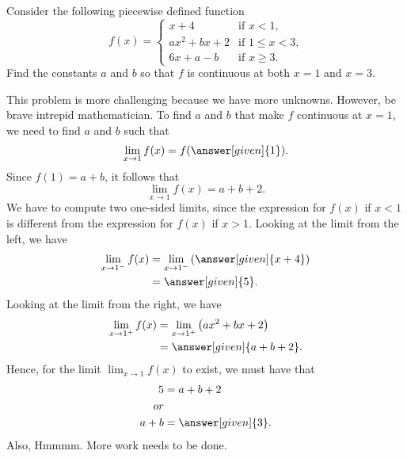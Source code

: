 \documentclass{ximera}
\begin{document}
\begin{example}
Consider the following piecewise defined function
\[
f(x) = 
\begin{cases}
  x+4 &\text{if $x<1$,}\\
  ax^2+bx+2 &\text{if $1\le x< 3$,}\\
  6x+a-b &\text{if $x\ge 3$.}
\end{cases}
\]
Find the constants $a$ and $b$ so that $f$ is continuous at both $x=1$ and $x=3$.
\begin{explanation}
This problem is more challenging because we have more
unknowns. However, be brave intrepid mathematician.  To find $a$ and
$b$ that make $f$ continuous at $x=1$, we need to find $a$ and $b$
such that
\[
\lim_{x\to 1} f(x) =f(\answer[given]{1}).
\]
Since $f(1)=a+b$, it follows that 
\[
\lim_{x\to 1} f(x) =a+b+2.
\]
We have to compute two one-sided limits, since the expression for  $f(x)$ if $x<1$ is  different from the expression for $f(x)$ if $x>1$.
Looking at the limit from the left, we have
\begin{align*}
  \lim_{x\to 1^-} f(x) &= \lim_{x\to 1^-} \left(\answer[given]{x+4}\right) \\
  &=\answer[given]{5}.
\end{align*}
Looking at the limit from the right, we have
\begin{align*}
  \lim_{x\to 1^+} f(x) &= \lim_{x\to 1^+} \left(ax^2+bx+2\right) \\
  &= \answer[given]{a+b+2}.
\end{align*}
Hence, for the limit $\lim_{x\to 1} f(x)$ to exist, we must have that 
\begin{align*}
  5 &= a+b+2\\ or\\
  a+b &= \answer[given]{3}.
\end{align*}
Also, 
Hmmmm. More work needs to be done.


\end{explanation}
\end{example}
\end{document}
